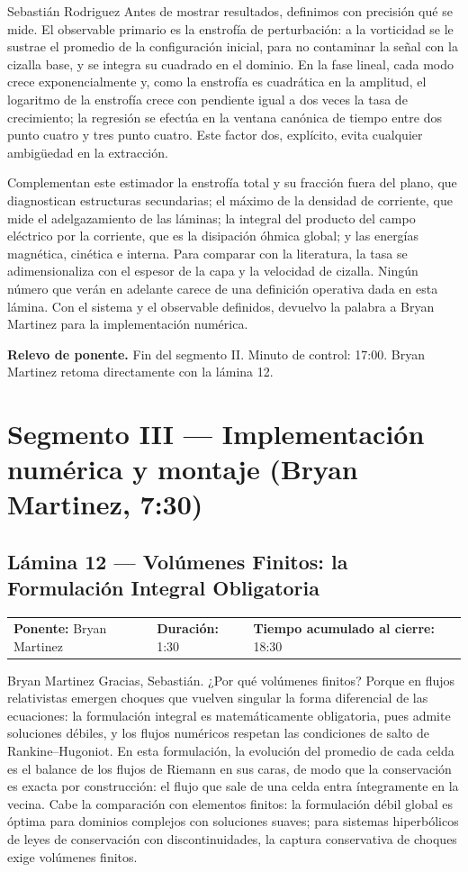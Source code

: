 \documentclass[11pt,letterpaper]{article}
\makeatletter
\newcommand{\lamina}[5]{%
  \subsection*{Lámina #1 --- #2}
  \noindent
  \begin{tabular}{@{}llll@{}}
    \textbf{Ponente:} #3 &\quad \textbf{Duración:} #4 &\quad
    \textbf{Tiempo acumulado al cierre:} #5 &
  \end{tabular}
  \vspace{2pt}}
\newcommand{\relevo}[1]{%
  \begin{center}
  \begin{tcolorbox}[colback=gold!20,colframe=gold!80!black,boxrule=0.6pt,
    width=0.92\linewidth,arc=1.5pt,left=6pt,right=6pt,top=4pt,bottom=4pt]
    \small\textbf{Relevo de ponente.} #1
  \end{tcolorbox}
  \end{center}}
\makeatother
\begin{document}
\begin{parlamento}{Sebastián Rodriguez}
Antes de mostrar resultados, definimos con precisión qué se mide. El
observable primario es la enstrofía de perturbación: a la vorticidad se le
sustrae el promedio de la configuración inicial, para no contaminar la señal
con la cizalla base, y se integra su cuadrado en el dominio. En la fase
lineal, cada modo crece exponencialmente y, como la enstrofía es cuadrática
en la amplitud, el logaritmo de la enstrofía crece con pendiente igual a dos
veces la tasa de crecimiento; la regresión se efectúa en la ventana canónica
de tiempo entre dos punto cuatro y tres punto cuatro. Este factor dos,
explícito, evita cualquier ambigüedad en la extracción.

Complementan este estimador la enstrofía total y su fracción fuera del
plano, que diagnostican estructuras secundarias; el máximo de la densidad de
corriente, que mide el adelgazamiento de las láminas; la integral del
producto del campo eléctrico por la corriente, que es la disipación óhmica
global; y las energías magnética, cinética e interna. Para comparar con la
literatura, la tasa se adimensionaliza con el espesor de la capa y la
velocidad de cizalla. Ningún número que verán en adelante carece de una
definición operativa dada en esta lámina. Con el sistema y el observable
definidos, devuelvo la palabra a Bryan Martinez para la implementación
numérica.
\end{parlamento}

\relevo{Fin del segmento II. Minuto de control: 17:00. Bryan Martinez
retoma directamente con la lámina 12.}

\section{Segmento III --- Implementación numérica y montaje (Bryan Martinez, 7:30)}

\lamina{12}{Volúmenes Finitos: la Formulación Integral Obligatoria}{Bryan Martinez}{1:30}{18:30}

\begin{parlamento}{Bryan Martinez}
Gracias, Sebastián. ¿Por qué volúmenes finitos? Porque en flujos relativistas
emergen choques que vuelven singular la forma diferencial de las ecuaciones:
la formulación integral es matemáticamente obligatoria, pues admite
soluciones débiles, y los flujos numéricos respetan las condiciones de salto
de Rankine--Hugoniot. En esta formulación, la evolución del promedio de cada
celda es el balance de los flujos de Riemann en sus caras, de modo que la
conservación es exacta por construcción: el flujo que sale de una celda
entra íntegramente en la vecina. Cabe la comparación con elementos finitos:
la formulación débil global es óptima para dominios complejos con soluciones
suaves; para sistemas hiperbólicos de leyes de conservación con
discontinuidades, la captura conservativa de choques exige volúmenes
finitos.
\end{parlamento}
\end{document}
